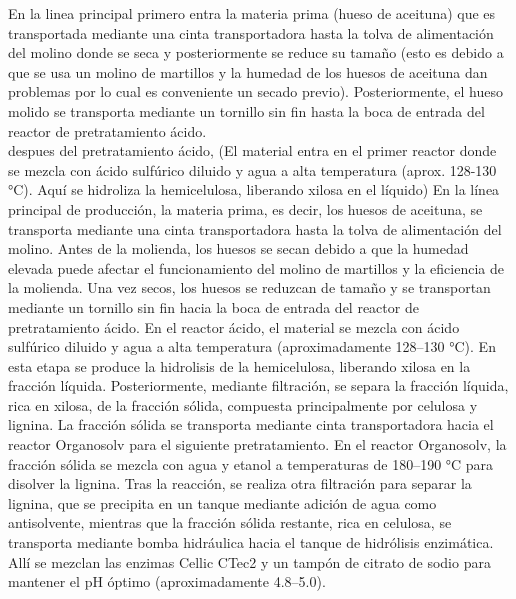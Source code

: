 \documentclass{report}
\begin{document}
\begin{flushleft}
    

En la linea principal primero entra la materia prima (hueso de aceituna) que es transportada mediante una cinta transportadora hasta la tolva de alimentación del molino donde se seca y posteriormente se reduce su tamaño (esto es debido a que se usa un molino de martillos y la humedad de los huesos de aceituna dan problemas por lo cual es conveniente un secado previo). Posteriormente, el hueso molido se transporta mediante un tornillo sin fin hasta la boca de entrada del reactor de pretratamiento ácido.\\
despues del pretratamiento ácido, (El material entra en el primer reactor donde se mezcla con ácido sulfúrico diluido y agua a alta temperatura (aprox. 128-130 °C). Aquí se hidroliza la hemicelulosa, liberando xilosa en el líquido)
\vspace{1em}
En la línea principal de producción, la materia prima, es decir, los huesos de aceituna, se transporta mediante una cinta transportadora hasta la tolva de alimentación del molino. Antes de la molienda, los huesos se secan debido a que la humedad elevada puede afectar el funcionamiento del molino de martillos y la eficiencia de la molienda. Una vez secos, los huesos se reduzcan de tamaño y se transportan mediante un tornillo sin fin hacia la boca de entrada del reactor de pretratamiento ácido.
\vspace{1em}
En el reactor ácido, el material se mezcla con ácido sulfúrico diluido y agua a alta temperatura (aproximadamente 128–130 °C). En esta etapa se produce la hidrolisis de la hemicelulosa, liberando xilosa en la fracción líquida. Posteriormente, mediante filtración, se separa la fracción líquida, rica en xilosa, de la fracción sólida, compuesta principalmente por celulosa y lignina. La fracción sólida se transporta mediante cinta transportadora hacia el reactor Organosolv para el siguiente pretratamiento.
\vspace{1em}
En el reactor Organosolv, la fracción sólida se mezcla con agua y etanol a temperaturas de 180–190 °C para disolver la lignina. Tras la reacción, se realiza otra filtración para separar la lignina, que se precipita en un tanque mediante adición de agua como antisolvente, mientras que la fracción sólida restante, rica en celulosa, se transporta mediante bomba hidráulica hacia el tanque de hidrólisis enzimática. Allí se mezclan las enzimas Cellic CTec2 y un tampón de citrato de sodio para mantener el pH óptimo (aproximadamente 4.8–5.0).
\vspace{1em}

\end{flushleft}
\end{document}
